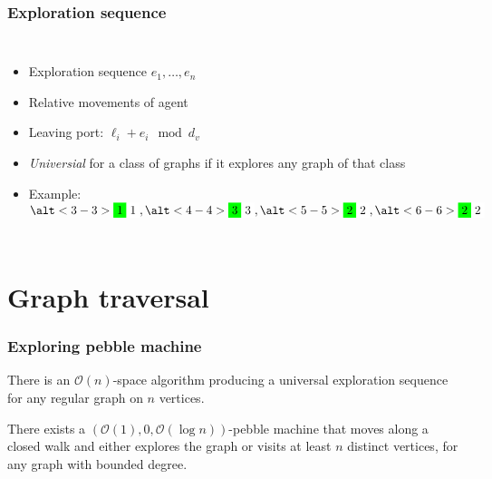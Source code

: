 \documentclass{beamer}
\begin{document}
\begin{frame}
  \frametitle{Exploration sequence}
  \begin{columns}
    \begin{itemize}
      \item Exploration sequence $e_{1},\dots, e_{n}$
      \item Relative movements of agent
      \item Leaving port: $\ell_{i} + e_{i}\mod d_{v}$
      \item \emph{Universial} for a class of graphs if it explores any graph of
        that class
      \item<2->[$\rightarrow$] Example:
        $\alt<3-3>{\colorbox{green}{1}}{\colorbox{white!0}{1}},
        \alt<4-4>{\colorbox{green}{3}}{\colorbox{white!0}{3}},
        \alt<5-5>{\colorbox{green}{2}}{\colorbox{white!0}{2}},
        \alt<6-6>{\colorbox{green}{2}}{\colorbox{white!0}{2}}$
    \end{itemize}
    \begin{center}
      \resizebox{\textwidth}{!}{}
    \end{center}
  \end{columns}
\end{frame}

\section{Graph traversal}
\begin{frame}
  \frametitle{Exploring pebble machine}
  \begin{theorem}[Reingold]
    There is an $\mathcal{O}(n)$-space algorithm producing a universal
    exploration sequence for any regular graph on $n$ vertices.
  \end{theorem}
  \begin{center}
  \end{center}
  \begin{theorem}
    There exists a $(\mathcal{O}(1), 0, \mathcal{O}(\log n))$-pebble machine
    that moves along a closed walk and either explores the graph or visits at
    least $n$ distinct vertices, for any graph with bounded degree.
  \end{theorem}
\end{frame}
\end{document}
